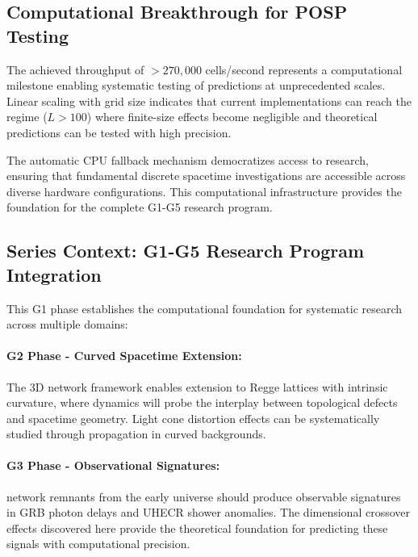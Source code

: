 \subsection{Computational Breakthrough for POSP Testing}

The achieved throughput of $>270,000$ \saturon{} cells/second represents a 
computational milestone enabling systematic testing of \posp{} predictions 
at unprecedented scales. Linear scaling with grid size indicates that current 
implementations can reach the regime ($L > 100$) where finite-size effects 
become negligible and theoretical predictions can be tested with high precision.

The automatic CPU fallback mechanism democratizes access to \posp{} research, 
ensuring that fundamental discrete spacetime investigations are accessible 
across diverse hardware configurations. This computational infrastructure 
provides the foundation for the complete G1-G5 research program.

\subsection{Series Context: G1-G5 Research Program Integration}

This G1 phase establishes the computational foundation for systematic \saturon{} 
research across multiple domains:

\paragraph{G2 Phase - Curved Spacetime Extension:}
The 3D \saturon{} network framework enables extension to Regge lattices with 
intrinsic curvature, where \saturon{} dynamics will probe the interplay between 
topological defects and spacetime geometry. Light cone distortion effects can 
be systematically studied through \saturon{} propagation in curved backgrounds.

\paragraph{G3 Phase - Observational Signatures:}
\saturon{} network remnants from the early universe should produce observable 
signatures in GRB photon delays and UHECR shower anomalies. The dimensional 
crossover effects discovered here provide the theoretical foundation for 
predicting these signals with computational precision.

